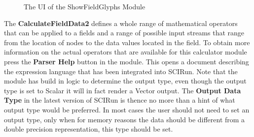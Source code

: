 \documentclass[fleqn,11pt,openany]{book}
\begin{document}
\begin{figure}
\caption{The UI of the ShowFieldGlyphs Module}\label{fig:ShowFieldGlyphs}
\end{figure}
 

The {\bf CalculateFieldData2} defines a whole range of mathematical operators that can be applied to a fields and a range of possible input streams that range from the location of nodes to the data values located in the field. To obtain more information on the actual operators that are available for this calculator module press the {\bf Parser Help} button in the module. This opens a document describing the expression language that has been integrated into SCIRun.  Note that the module has build in logic to determine the output type, even though the output type is set to Scalar it will in fact render a Vector output. The {\bf Output Data Type} in the latest version of SCIRun is thence no more than a hint of what output type would be preferred. In most cases the user should not need to set an output type, only when for memory reasons the data should be different from a double precision representation, this type should be set. 
 
\end{document}
